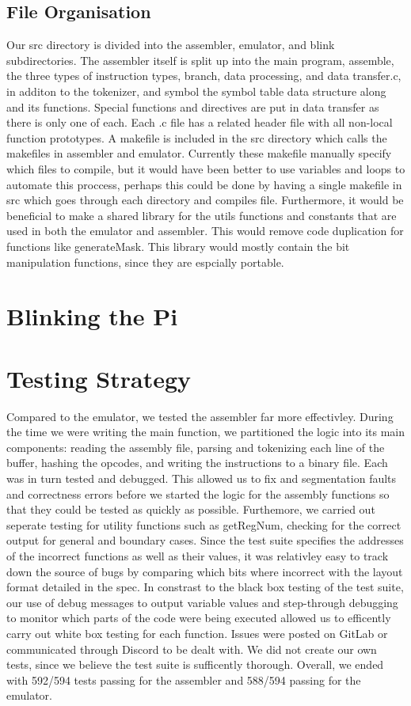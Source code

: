 \documentclass[11pt]{article}
\begin{document}
\subsection{File Organisation}
Our src directory is divided into the assembler, emulator, and blink subdirectories. The assembler itself is split up into the main program, assemble, the three types of instruction types, branch, data processing, and data transfer.c, in additon to the tokenizer, and symbol the symbol table data structure along and its functions. Special functions and directives are put in data transfer as there is only one of each. Each .c file has a related header file with all non-local function prototypes. A makefile is included in the src directory which calls the makefiles in assembler and emulator. Currently these makefile manually specify which files to compile, but it would have been better to use variables and loops to automate this proccess, perhaps this could be done by having a single makefile in src which goes through each directory and compiles file. Furthermore, it would be beneficial to make a shared library for the utils functions and constants that are used in both the emulator and assembler. This would remove code duplication for functions like generateMask. This library would mostly contain the bit manipulation functions, since they are espcially portable. 

\section{Blinking the Pi}


\section{Testing Strategy}
Compared to the emulator, we tested the assembler far more effectivley. During the time we were writing the main function, we partitioned the logic into its main components: reading the assembly file, parsing and tokenizing each line of the buffer, hashing the opcodes, and writing the instructions to a binary file. Each was in turn tested and debugged. This allowed us to fix and segmentation faults and correctness errors before we started the logic for the assembly functions so that they could be tested as quickly as possible. Furthemore, we carried out seperate testing for utility functions such as getRegNum, checking for the correct output for general and boundary cases. Since the test suite specifies the addresses of the incorrect functions as well as their values, it was relativley easy to track down the source of bugs by comparing which bits where incorrect with the layout format detailed in the spec. In constrast to the black box testing of the test suite, our use of debug messages to output variable values and step-through debugging to monitor which parts of the code were being executed allowed us to efficently carry out white box testing for each function. Issues were posted on GitLab or communicated through Discord to be dealt with. We did not create our own tests, since we believe the test suite is sufficently thorough. Overall, we ended with 592/594 tests passing for the assembler and 588/594 passing for the emulator. 
\end{document}
